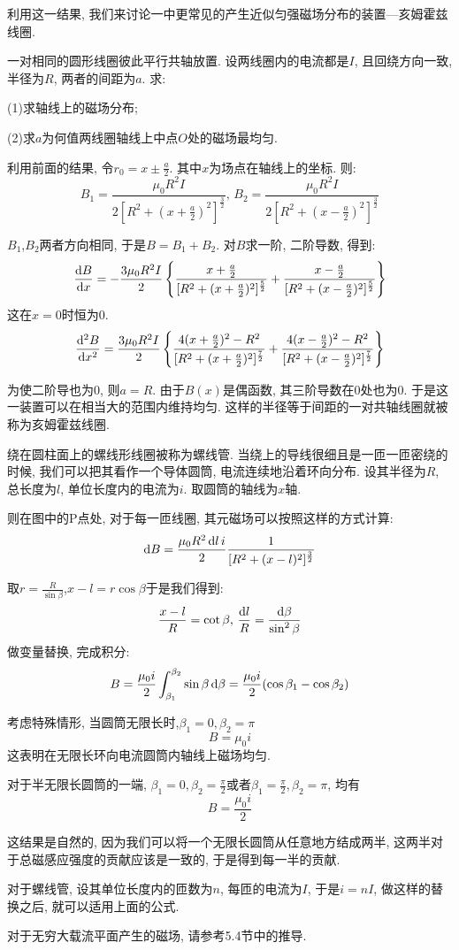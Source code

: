 利用这一结果, 我们来讨论一中更常见的产生近似匀强磁场分布的装置---亥姆霍兹线圈.

\begin{example}
一对相同的圆形线圈彼此平行共轴放置. 设两线圈内的电流都是$I$, 且回绕方向一致, 半径为$R$, 两者的间距为$a$. 求:

(1)求轴线上的磁场分布;

(2)求$a$为何值两线圈轴线上中点$O$处的磁场最均匀.

利用前面的结果, 令$r_0=x\pm\frac{a}{2}$. 其中$x$为场点在轴线上的坐标.
则:
\[
B_1=\frac{\mu_0R^2I}{2[R^2+(x+\frac{a}{2})^2]^{\frac{3}{2}}}, \, B_2=\frac{\mu_0R^2I}{2[R^2+(x-\frac{a}{2})^2]^{\frac{3}{2}}}
\]

$B_1$,$B_2$两者方向相同, 于是$B=B_1+B_2$. 对$B$求一阶, 二阶导数, 得到:
\[
\frac{\mathop{}\!\mathrm{d} B}{\mathop{}\!\mathrm{d} x}=-\frac{3\mu_0R^2I}{2}\left\{ \frac{x+\frac{a}{2}}{[R^2+(x+\frac{a}{2})^2]^{\frac{5}{2}}}+\frac{x-\frac{a}{2}}{[R^2+(x-\frac{a}{2})^2]^{\frac{5}{2}}}\right\}
\]
这在$x=0$时恒为$0$.
\[
\frac{\mathop{}\!\mathrm{d}^2 B}{\mathop{}\!\mathrm{d} x^2} = \frac{3\mu_0R^2I}{2}\left\{ \frac{4(x+\frac{a}{2})^2-R^2}{[R^2+(x+\frac{a}{2})^2]^{\frac{7}{2}}}+\frac{4(x-\frac{a}{2})^2-R^2}{[R^2+(x-\frac{a}{2})^2]^{\frac{7}{2}}}\right\}
\]

为使二阶导也为$0$, 则$a=R$. 由于$B(x)$是偶函数, 其三阶导数在$0$处也为$0$. 于是这一装置可以在相当大的范围内维持均匀. 这样的半径等于间距的一对共轴线圈就被称为亥姆霍兹线圈.
\end{example}

\begin{example}
  绕在圆柱面上的螺线形线圈被称为螺线管. 当绕上的导线很细且是一匝一匝密绕的时候, 我们可以把其看作一个导体圆筒, 电流连续地沿着环向分布. 设其半径为$R$, 总长度为$l$, 单位长度内的电流为$i$. 取圆筒的轴线为$x$轴.


  则在图中的P点处, 对于每一匝线圈, 其元磁场可以按照这样的方式计算:
  \[
  \mathop{}\!\mathrm{d} B = \frac{\mu_0R^2\mathop{}\!\mathrm{d} l\, i}{2}\frac{1}{[R^2+(x-l)^2]^\frac{3}{2}}
  \]

  取$r=\frac{R}{\sin\beta}$,$x-l=r\cos\beta$于是我们得到:
  \[
  \frac{x-l}{R}=\cot\beta, \,\frac{\mathop{}\!\mathrm{d} l}{R}=\frac{\mathop{}\!\mathrm{d} \beta}{\sin^2\beta}
  \]
  做变量替换, 完成积分:
  \[
  B=\frac{\mu_0 i}{2}\int_{\beta_1}^{\beta_2}\sin\beta\mathop{}\!\mathrm{d}\beta=\frac{\mu_0i}{2}(\cos\beta_1-\cos\beta_2)
  \]

  考虑特殊情形, 当圆筒无限长时,$\beta_1=0,\beta_2=\pi$
  \[
  B=\mu_0 i
  \]
  这表明在无限长环向电流圆筒内轴线上磁场均匀.

  对于半无限长圆筒的一端, $\beta_1=0,\beta_2=\frac{\pi}{2}$或者$\beta_1=\frac{\pi}{2},\beta_2=\pi$, 均有
  \[
  B = \frac{\mu_0i}{2}
  \]

  这结果是自然的, 因为我们可以将一个无限长圆筒从任意地方结成两半, 这两半对于总磁感应强度的贡献应该是一致的, 于是得到每一半的贡献.

  对于螺线管, 设其单位长度内的匝数为$n$, 每匝的电流为$I$, 于是$i=nI$, 做这样的替换之后, 就可以适用上面的公式.

  对于无穷大载流平面产生的磁场, 请参考5.4节中的推导.
\end{example}

